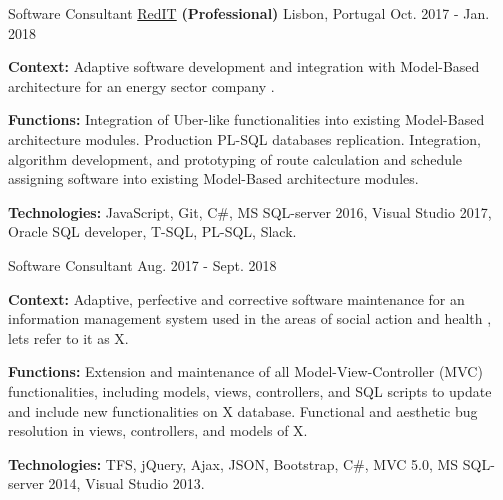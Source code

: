 \begin{cventries}
  \cventry
    {Software Consultant} %
    {\href{https://www.reditpro.com/}{RedIT} \textbf{(Professional)}} %
    {Lisbon, Portugal} %
    {Oct. 2017 - Jan. 2018} %
    {
      \begin{cvitems} %
		\item {\textbf{Context:} 
Adaptive software development and integration with Model-Based architecture for an energy sector company %
.}
		\item {\textbf{Functions:} Integration of Uber-like functionalities into existing Model-Based architecture modules. Production PL-SQL databases replication. Integration, algorithm development, and prototyping of route calculation and schedule assigning software into existing Model-Based architecture modules.}		
		\item {\textbf{Technologies:} JavaScript, Git, C\#, MS SQL-server 2016, Visual Studio 2017, Oracle SQL developer, T-SQL, PL-SQL, Slack.}
      \end{cvitems}
    } 
    
  \cventry
    {Software Consultant} %
    {} %
    {} %
    {Aug. 2017 - Sept. 2018} %
    {
      \begin{cvitems} %
		\item {\textbf{Context:} 
Adaptive, perfective and corrective software maintenance for an information management system used in the areas of social action and health %
, lets refer to it as X.}
		\item {\textbf{Functions:} Extension and maintenance of all Model-View-Controller (MVC) functionalities, including models, views, controllers, and SQL scripts to update and include new functionalities on X database. Functional and aesthetic bug resolution in views, controllers, and models of X.}		
		\item {\textbf{Technologies:} TFS, jQuery, Ajax, JSON, Bootstrap, C\#, MVC 5.0, MS SQL-server 2014, Visual Studio 2013.}
      \end{cvitems}
    } 
    

\end{cventries}
